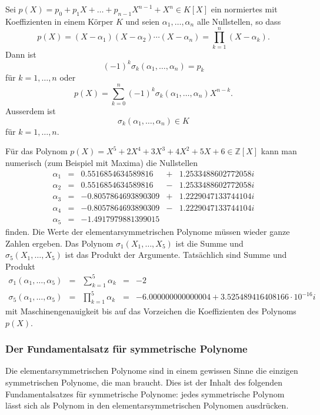 \begin{satz}
Sei $p(X) = p_0+p_1X+\dots +p_{n-1}X^{n-1} + X^n\in K[X]$ ein normiertes
mit Koeffizienten in einem Körper $K$ und seien $\alpha_1,\dots,\alpha_n$
alle Nullstellen, so dass 
\[
p(X)
=
(X-\alpha_1)(X-\alpha_2)\cdots(X-\alpha_n) =
\prod_{k=1}^n (X-\alpha_k).
\]
Dann ist 
\[
(-1)^k
\sigma_k(\alpha_1,\dots,\alpha_n) 
=
p_k
\]
für $k=1,\dots,n$ oder
\[
p(X)
=
\sum_{k=0}^n
(-1)^k
\sigma_k(\alpha_1,\dots,\alpha_n) X^{n-k}.
\]
Ausserdem ist
\[
\sigma_k(\alpha_1,\dots,\alpha_n) \in K
\]
für $k=1,\dots,n$.
\end{satz}

\begin{beispiel}
Für das Polynom $p(X) = X^5 + 2X^4+3X^3+4X^2+5X+6\in\mathbb{Z}[X]$
kann man numerisch (zum Beispiel mit Maxima) die Nullstellen
\[
\renewcommand{\arraycolsep}{1.5pt}
\begin{array}{rcrcl}
\alpha_1 &=&  0.5516854634589816 &+& 1.2533488602772058 i\\
\alpha_2 &=&  0.5516854634589816 &-& 1.2533488602772058 i\\
\alpha_3 &=& -0.8057864693890309 &+& 1.2229047133744104 i\\
\alpha_4 &=& -0.8057864693890309 &-& 1.2229047133744104 i\\
\alpha_5 &=& -1.4917979881399015 & &
\end{array}
\]
finden.
Die Werte der elementarsymmetrischen Polynome müssen wieder
ganze Zahlen ergeben. 
Das Polynom $\sigma_1(X_1,\dots,X_5)$ ist die Summe
und $\sigma_5(X_1,\dots,X_5)$ ist das Produkt der Argumente.
Tatsächlich sind Summe und Produkt
\[
\renewcommand{\arraycolsep}{1.5pt}
\begin{array}{rcccl}
\sigma_1(\alpha_1,\dots,\alpha_5)
&=&
\displaystyle
\sum_{k=1}^5 \alpha_k
&=&
-2
\\
\sigma_5(\alpha_1,\dots,\alpha_5)
&=&
\displaystyle
\prod_{k=1}^5 \alpha_k
&=&
-6.000000000000004 + 3.525489416408166\cdot 10^{-16}i
\end{array}
\]
mit Maschinengenauigkeit bis auf das Vorzeichen die Koeffizienten
des Polynoms $p(X)$.
\end{beispiel}

%
%
\subsubsection{Der Fundamentalsatz für symmetrische Polynome}
Die elementarsymmetrischen Polynome sind in einem gewissen Sinne
die einzigen symmetrischen Polynome, die man braucht.
Dies ist der Inhalt des folgenden Fundamentalsatzes für
symmetrische Polynome: jedes symmetrische Polynom lässt sich
als Polynom in den elementarsymmetrischen Polynomen ausdrücken.

